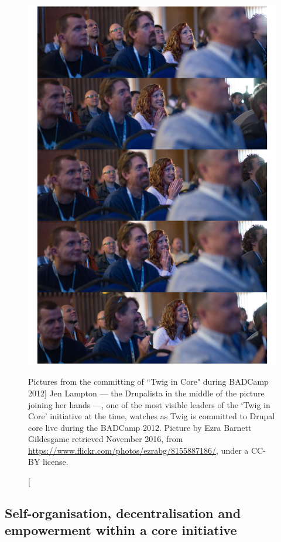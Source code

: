 \begin{figure}[H]
\centering
\includegraphics[scale=0.45]{img/online/twig_in_core.jpg}
\caption[Pictures from the committing of ``Twig in Core" during BADCamp 2012]%
{Jen Lampton --- the Drupalista in the middle of the picture joining her hands ---, one of the most visible leaders of the `Twig in Core' initiative at the time, watches as Twig is committed to Drupal core live during the BADCamp 2012. Picture by Ezra Barnett Gildesgame retrieved  November 2016, from \url{https://www.flickr.com/photos/ezrabg/8155887186/}, under a CC-BY license.}
\label{twig-core}
\end{figure}

\subsection{Self-organisation, decentralisation and empowerment within a core initiative}

